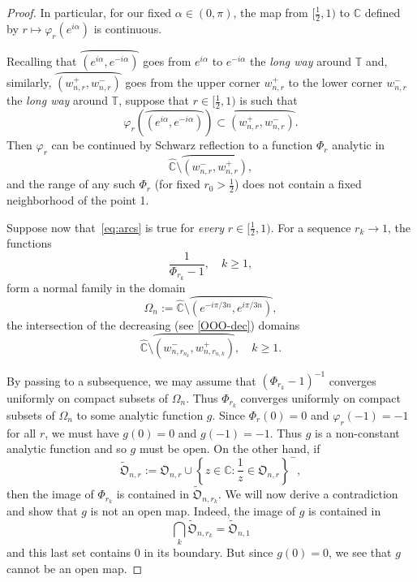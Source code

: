 \documentclass[11pt,reqno]{amsart}
\numberwithin{equation}{section}
\theoremstyle{plain}
\theoremstyle{definition}
\begin{document}
\begin{proof}
In particular, for our fixed $\alpha \in (0, \pi)$, the map from $[\frac{1}{2}, 1)$ to ${ \mathbb{C}}$ defined by  $r\mapsto {\varphi}_r(e^{i\alpha})$ is continuous.

Recalling that 
$\wideparen{(e^{i \alpha}, e^{-i\alpha})}$ goes from $e^{i \alpha}$ to $e^{-i\alpha}$ the\emph{ long way} around ${\mathbb{T}}$ and, similarly, 
$\wideparen{(w^+_{n,r}, w^{-}_{n,r})}$ goes from the upper corner $w^{+}_{n, r}$ to the lower corner $w^{-}_{n, r}$ the\emph{ long way} around ${\mathbb{T}}$, 
suppose that  $r\in [\frac{1}{2}, 1)$ is such that 
\begin{equation}\label{eq:arcs}
 {\varphi}_r(\wideparen{(e^{i\alpha}, e^{-i\alpha})})\subset \wideparen{(w^+_{n,r}, w^-_{n,r})}.
\end{equation}
Then ${\varphi}_r$ can be continued by Schwarz reflection  to a function $\Phi_r$ analytic in
 $$\widehat{ \mathbb{C}} \setminus \wideparen{(w^-_{n,r}, w^+_{n,r})},$$ and the range of any such $\Phi_r$ (for fixed $r_0 > \frac{1}{2}$) does not contain a fixed neighborhood of the point 1. 

Suppose now that~\eqref{eq:arcs} is true for \emph{every} $r\in [\frac{1}{2}, 1)$. For a sequence $r_k\to 1$, the functions $$\frac{1}{\Phi_{r_k}-1}, \quad k \geq 1,$$ form a normal family in the domain
$$\Omega_n:= \widehat{ \mathbb{C}}\setminus \wideparen{(e^{-i\pi/3n}, e^{i\pi/3n})},$$
the intersection of the decreasing (see \eqref{OOO-dec}) domains 
$$\widehat{ \mathbb{C}} \setminus \wideparen{(w^{-}_{n, r_{n_k}}, w^{+}_{n, r_{n, k}})}, \quad  k \geq 1.$$

By passing to a subsequence, we may assume that $(\Phi_{r_k}-1)^{-1}$ converges uniformly on compact subsets of $\Omega_n $. Thus $\Phi_{r_k}$ converges uniformly on compact subsets of $\Omega_n$ to some analytic function $g$. Since $\Phi_r(0)=0$ and ${\varphi}_r(-1)=-1$ for all $r$, we must have $g(0)=0$ and $g(-1)=-1$. Thus $g$ is a non-constant analytic function  and so $g$ must be open. On the other hand, if 
$$\widetilde{\mathfrak{O}}_{n, r} := {\mathfrak{O}}_{n, r} \cup 
\left\{z \in { \mathbb{C}}: \frac{1}{z} \in {\mathfrak{O}}_{n, r}
\right\}^{-},$$
then the image of $\Phi_{r_k}$ is contained in $\widetilde{\mathfrak{O}}_{n, r_k}$. 
We will now derive a contradiction and show that $g$ is not an open map. Indeed, the image of $g$ is contained in 
$$\bigcap_{k} \widetilde{\mathfrak{O}}_{n, r_k} = \widetilde{\mathfrak{O}}_{n, 1}$$
and this last set contains $0$ in its boundary. But since $g(0) = 0$, we see that $g$ cannot be an open map. 


\end{proof}
\end{document}
